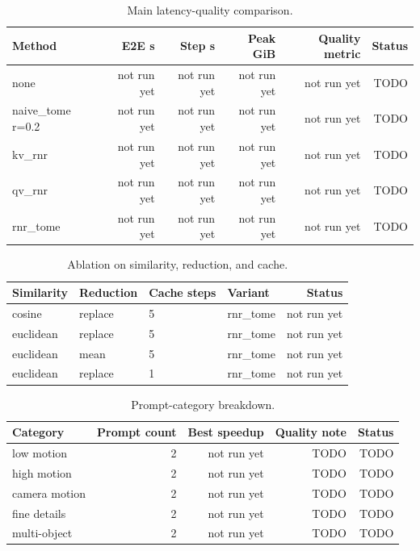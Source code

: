 \documentclass{article}
\begin{document}
\begin{table}[t]
\centering
\caption{Main latency-quality comparison.}
\begin{tabular}{lrrrrr}
\toprule
Method & E2E s & Step s & Peak GiB & Quality metric & Status \\
\midrule
none & not run yet & not run yet & not run yet & not run yet & TODO \\
naive\_tome r=0.2 & not run yet & not run yet & not run yet & not run yet & TODO \\
kv\_rnr & not run yet & not run yet & not run yet & not run yet & TODO \\
qv\_rnr & not run yet & not run yet & not run yet & not run yet & TODO \\
rnr\_tome & not run yet & not run yet & not run yet & not run yet & TODO \\
\bottomrule
\end{tabular}
\end{table}

\begin{table}[t]
\centering
\caption{Ablation on similarity, reduction, and cache.}
\begin{tabular}{llllr}
\toprule
Similarity & Reduction & Cache steps & Variant & Status \\
\midrule
cosine & replace & 5 & rnr\_tome & not run yet \\
euclidean & replace & 5 & rnr\_tome & not run yet \\
euclidean & mean & 5 & rnr\_tome & not run yet \\
euclidean & replace & 1 & rnr\_tome & not run yet \\
\bottomrule
\end{tabular}
\end{table}

\begin{table}[t]
\centering
\caption{Prompt-category breakdown.}
\begin{tabular}{lrrrr}
\toprule
Category & Prompt count & Best speedup & Quality note & Status \\
\midrule
low motion & 2 & not run yet & TODO & TODO \\
high motion & 2 & not run yet & TODO & TODO \\
camera motion & 2 & not run yet & TODO & TODO \\
fine details & 2 & not run yet & TODO & TODO \\
multi-object & 2 & not run yet & TODO & TODO \\
\bottomrule
\end{tabular}
\end{table}
\end{document}
